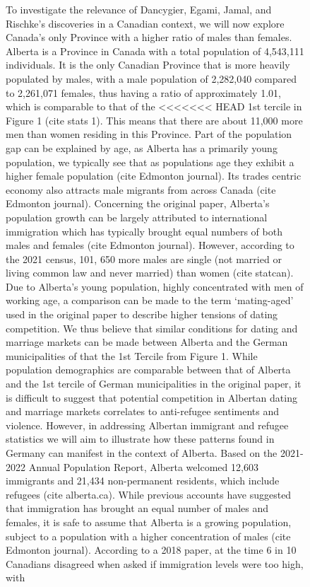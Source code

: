 \documentclass[
]{article}
\begin{document}
\begin{figure}
To investigate the relevance of Dancygier, Egami, Jamal, and Rischke's
discoveries in a Canadian context, we will now explore Canada's only
Province with a higher ratio of males than females. Alberta is a
Province in Canada with a total population of 4,543,111 individuals. It
is the only Canadian Province that is more heavily populated by males,
with a male population of 2,282,040 compared to 2,261,071 females, thus
having a ratio of approximately 1.01, which is comparable to that of the
<<<<<<< HEAD
1st tercile in Figure 1 (cite stats 1). This means that there are about
11,000 more men than women residing in this Province. Part of the
population gap can be explained by age, as Alberta has a primarily young
population, we typically see that as populations age they exhibit a
higher female population (cite Edmonton journal). Its trades centric
economy also attracts male migrants from across Canada (cite Edmonton
journal). Concerning the original paper, Alberta's population growth can
be largely attributed to international immigration which has typically
brought equal numbers of both males and females (cite Edmonton journal).
However, according to the 2021 census, 101, 650 more males are single
(not married or living common law and never married) than women (cite
statcan). Due to Alberta's young population, highly concentrated with
men of working age, a comparison can be made to the term `mating-aged'
used in the original paper to describe higher tensions of dating
competition. We thus believe that similar conditions for dating and
marriage markets can be made between Alberta and the German
municipalities of that the 1st Tercile from Figure 1. While population
demographics are comparable between that of Alberta and the 1st tercile
of German municipalities in the original paper, it is difficult to
suggest that potential competition in Albertan dating and marriage
markets correlates to anti-refugee sentiments and violence. However, in
addressing Albertan immigrant and refugee statistics we will aim to
illustrate how these patterns found in Germany can manifest in the
context of Alberta. Based on the 2021-2022 Annual Population Report,
Alberta welcomed 12,603 immigrants and 21,434 non-permanent residents,
which include refugees (cite alberta.ca). While previous accounts have
suggested that immigration has brought an equal number of males and
females, it is safe to assume that Alberta is a growing population,
subject to a population with a higher concentration of males (cite
Edmonton journal). According to a 2018 paper, at the time 6 in 10
Canadians disagreed when asked if immigration levels were too high, with

\end{figure}
\end{document}
